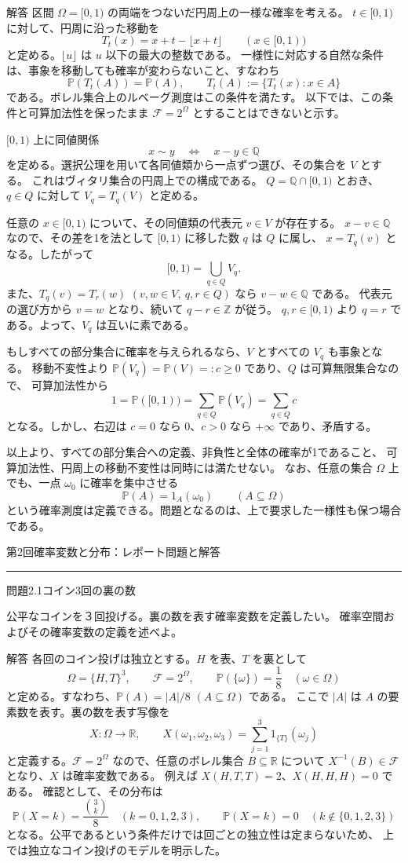 \documentclass[a4paper,10pt,pdflatex,ja=standard,jafont=ipaex-type1,
  magstyle=real,scale=1]{bxjsarticle}
\newcommand{\topic}[1]{\par\vspace{5pt}
  {\large\sffamily\mdseries\color{accent}#1}\par\vspace{2pt}}
\newcommand{\handouttitle}[1]{%
  \begin{center}
    {\Large\sffamily\mdseries\color{ink}#1}\par\vspace{3mm}
    {\color{accent}\rule{0.88\linewidth}{0.7pt}}
  \end{center}\vspace{-2mm}}
\newcommand{\keybox}[1]{\par\vspace{3pt}\begingroup
  \setlength{\fboxsep}{5pt}
  \colorbox{soft}{\parbox{\dimexpr\linewidth-2\fboxsep\relax}{#1}}%
  \endgroup\par\vspace{2pt}}
\newcommand{\examplelabel}[1]{{\sffamily\mdseries\color{ink}#1}}
\newcommand{\F}{\mathcal F}
\newcommand{\R}{\mathbb R}
\newcommand{\Prob}{\mathbb P}
\newcommand{\ind}{\mathrm{1}}
\begin{document}
\examplelabel{解答}
区間 $\Omega=[0,1)$ の両端をつないだ円周上の一様な確率を考える。
$t\in[0,1)$ に対して、円周に沿った移動を
$$
  T_t(x)=x+t-\lfloor x+t\rfloor\qquad(x\in[0,1))
$$
と定める。$\lfloor u\rfloor$ は $u$ 以下の最大の整数である。
一様性に対応する自然な条件は、事象を移動しても確率が変わらないこと、すなわち
$$
  \Prob(T_t(A))=\Prob(A),\qquad
  T_t(A):=\{T_t(x):x\in A\}
$$
である。ボレル集合上のルベーグ測度はこの条件を満たす。
以下では、この条件と可算加法性を保ったまま $\F=2^\Omega$ とすることはできないと示す。

$[0,1)$ 上に同値関係
$$
  x\sim y\quad\Longleftrightarrow\quad x-y\in\mathbb Q
$$
を定める。選択公理を用いて各同値類から一点ずつ選び、その集合を $V$ とする。
これはヴィタリ集合の円周上での構成である。
$Q=\mathbb Q\cap[0,1)$ とおき、$q\in Q$ に対して $V_q=T_q(V)$ と定める。

任意の $x\in[0,1)$ について、その同値類の代表元 $v\in V$ が存在する。
$x-v\in\mathbb Q$ なので、その差を1を法として $[0,1)$ に移した数 $q$ は $Q$ に属し、
$x=T_q(v)$ となる。したがって
$$
  [0,1)=\bigcup_{q\in Q}V_q.
$$
また、$T_q(v)=T_r(w)$ $(v,w\in V,\ q,r\in Q)$ なら $v-w\in\mathbb Q$ である。
代表元の選び方から $v=w$ となり、続いて $q-r\in\mathbb Z$ が従う。
$q,r\in[0,1)$ より $q=r$ である。よって、$V_q$ は互いに素である。

もしすべての部分集合に確率を与えられるなら、$V$ とすべての $V_q$ も事象となる。
移動不変性より $\Prob(V_q)=\Prob(V)=:c\ge0$ であり、$Q$ は可算無限集合なので、
可算加法性から
$$
  1=\Prob([0,1))=\sum_{q\in Q}\Prob(V_q)=\sum_{q\in Q}c
$$
となる。しかし、右辺は $c=0$ なら $0$、$c>0$ なら $+\infty$ であり、矛盾する。

以上より、すべての部分集合への定義、非負性と全体の確率が1であること、
可算加法性、円周上の移動不変性は同時には満たせない。
なお、任意の集合 $\Omega$ 上でも、一点 $\omega_0$ に確率を集中させる
$$
  \Prob(A)=\ind_A(\omega_0)\qquad(A\subseteq\Omega)
$$
という確率測度は定義できる。問題となるのは、上で要求した一様性も保つ場合である。

\clearpage
\handouttitle{第2回\quad 確率変数と分布：レポート問題と解答}

\topic{問題2.1\quad コイン3回の裏の数}
\keybox{公平なコインを３回投げる。裏の数を表す確率変数を定義したい。
確率空間およびその確率変数の定義を述べよ。}

\examplelabel{解答}
各回のコイン投げは独立とする。$H$ を表、$T$ を裏として
$$
  \Omega=\{H,T\}^3,\qquad \F=2^\Omega,\qquad
  \Prob(\{\omega\})=\frac18\quad(\omega\in\Omega)
$$
と定める。すなわち、$\Prob(A)=|A|/8$ $(A\subseteq\Omega)$ である。
ここで $|A|$ は $A$ の要素数を表す。裏の数を表す写像を
$$
  X:\Omega\longrightarrow\R,\qquad
  X(\omega_1,\omega_2,\omega_3)=\sum_{j=1}^{3}\ind_{\{T\}}(\omega_j)
$$
と定義する。$\F=2^\Omega$ なので、任意のボレル集合 $B\subseteq\R$ について
$X^{-1}(B)\in\F$ となり、$X$ は確率変数である。
例えば $X(H,T,T)=2$、$X(H,H,H)=0$ である。
確認として、その分布は
$$
  \Prob(X=k)=\frac{\binom3k}{8}\quad(k=0,1,2,3),\qquad
  \Prob(X=k)=0\quad(k\notin\{0,1,2,3\})
$$
となる。公平であるという条件だけでは回ごとの独立性は定まらないため、
上では独立なコイン投げのモデルを明示した。
\end{document}

